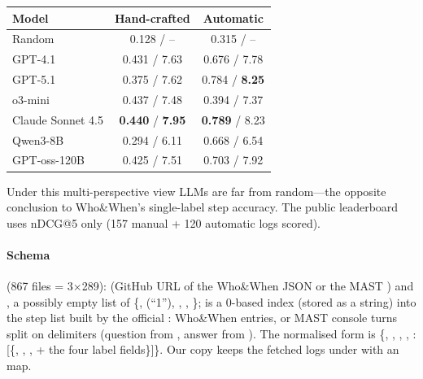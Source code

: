 \begin{center}\small
\begin{tabular}{@{}lcc@{}}\toprule
Model & Hand-crafted & Automatic\\\midrule
Random & 0.128 / -- & 0.315 / --\\
GPT-4.1 & 0.431 / 7.63 & 0.676 / 7.78\\
GPT-5.1 & 0.375 / 7.62 & 0.784 / \textbf{8.25}\\
o3-mini & 0.437 / 7.48 & 0.394 / 7.37\\
Claude Sonnet 4.5 & \textbf{0.440} / \textbf{7.95} & \textbf{0.789} / 8.23\\
Qwen3-8B & 0.294 / 6.11 & 0.668 / 6.54\\
GPT-oss-120B & 0.425 / 7.51 & 0.703 / 7.92\\\bottomrule
\end{tabular}
\end{center}
Under this multi-perspective view LLMs are far from random---the opposite conclusion to Who\&When's single-label step accuracy. The public leaderboard uses nDCG@5 only (157 manual + 120 automatic logs scored).

\paragraph{Schema}  (867 files = 3$\times$289):  (GitHub URL of the Who\&When JSON or the MAST ) and , a possibly empty list of \{,  (``1''), , , \};  is a 0-based index (stored as a string) into the step list built by the official : Who\&When  entries, or MAST console turns split on  delimiters (question from , answer from ). The normalised form is \{, , , , :[\{, , , + the four label fields\}]\}. Our copy keeps the fetched logs under  with an  map.

